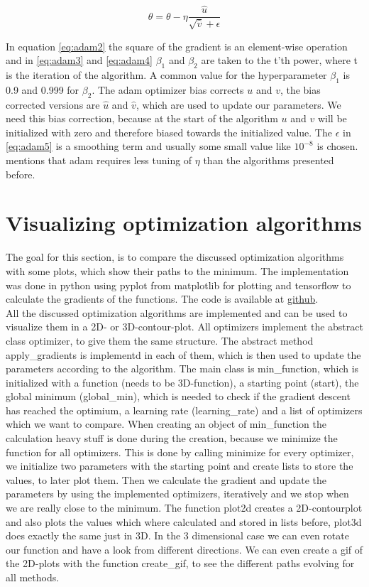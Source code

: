 \documentclass[aodsor,preprint]{imsart}
\numberwithin{equation}{section}
\theoremstyle{plain}
\begin{document}
\begin{equation} \label{eq:adam5}
\theta = \theta - \eta \frac{\hat{u}}{\sqrt{\hat{v}} + \epsilon}
\end{equation}

In equation \ref{eq:adam2} the square of the gradient is an element-wise operation and in \ref{eq:adam3} and \ref{eq:adam4} $\beta_{1}$ and $\beta_{2}$ are taken to the t'th power, where t is the iteration of the algorithm. A common value for the hyperparameter $\beta_{1}$ is 0.9 and 0.999 for $\beta_{2}$. The adam optimizer bias corrects $u$ and $v$, the bias corrected versions are $\hat{u}$ and $\hat{v}$, which are used to update our parameters. We need this bias correction, because at the start of the algorithm $u$ and $v$ will be initialized with zero and therefore biased towards the initialized value.
The $\epsilon$ in \ref{eq:adam5} is a smoothing term and usually some small value like $10^{-8}$ is chosen. \cite{geron2019hands} mentions that adam requires less tuning of $\eta$ than the algorithms presented before.

\section{Visualizing optimization algorithms}
The goal for this section, is to compare the discussed optimization algorithms with some plots, which show their paths to the minimum. The implementation was done in python using pyplot from matplotlib for plotting and tensorflow to calculate the gradients of the functions. The code is available at \href{https://github.com/SilentPlayer/Gradient-Descent/tree/main/code}{github}. \\
All the discussed optimization algorithms are implemented and can be used to visualize them in a 2D- or 3D-contour-plot. All optimizers implement the abstract class optimizer, to give them the same structure. The abstract method apply\_gradients is implementd in each of them, which is then used to update the parameters according to the algorithm. The main class is min\_function, which is initialized with a function (needs to be 3D-function), a starting point (start), the global minimum (global\_min), which is needed to check if the gradient descent has reached the optimium, a learning rate (learning\_rate) and a list of optimizers which we want to compare. When creating an object of min\_function the calculation heavy stuff is done during the creation, because we minimize the function for all optimizers. This is done by calling minimize for every optimizer, we initialize two parameters with the starting point and create lists to store the values, to later plot them. Then we calculate the gradient and update the parameters by using the implemented optimizers, iteratively and we stop when we are really close to the minimum. The function plot2d creates a 2D-contourplot and also plots the values which where calculated and stored in lists before, plot3d does exactly the same just in 3D. In the 3 dimensional case we can even rotate our function and have a look from different directions. We can even create a gif of the 2D-plots with the function create\_gif, to see the different paths evolving for all methods.
\end{document}
